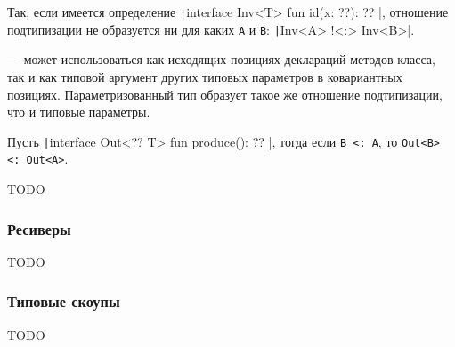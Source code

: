 Так, если имеется определение \texttt|interface Inv<T> { fun id(x: ??): ?? }|, отношение подтипизации не образуется ни для каких \texttt{A} и \texttt{B}: \texttt|Inv<A> !<:> Inv<B>|.

\begin{definition}\label{def:covariant}
     --- может использоваться как исходящих позициях деклараций методов класса, так и как типовой аргумент других типовых параметров в ковариантных позициях.
    Параметризованный тип образует такое же отношение подтипизации, что и типовые параметры.
\end{definition}

Пусть \texttt|interface Out<?? T> { fun produce(): ?? }|, тогда если \texttt{B <: A}, то \texttt{Out<B> <: Out<A>}.

TODO %

\subsubsection{Ресиверы}

TODO %

\subsubsection{Типовые скоупы}

TODO %
